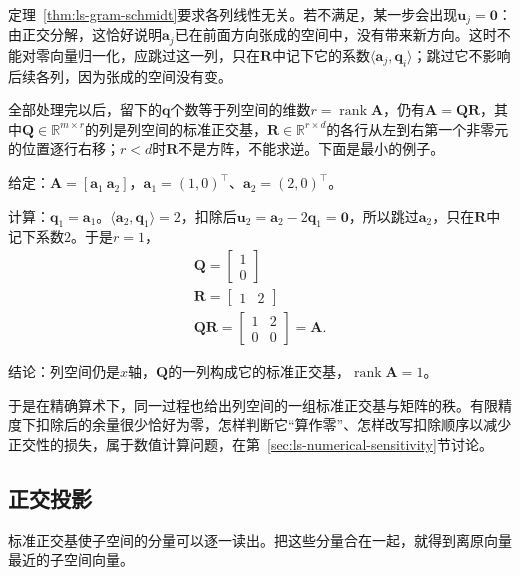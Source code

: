 定理~\ref{thm:ls-gram-schmidt}要求各列线性无关。若不满足，某一步会出现$\bm u_j=\bm0$：由正交分解，这恰好说明$\bm a_j$已在前面方向张成的空间中，没有带来新方向。这时不能对零向量归一化，应跳过这一列，只在$\bm R$中记下它的系数$\langle\bm a_j,\bm q_i\rangle$；跳过它不影响后续各列，因为张成的空间没有变。

全部处理完以后，留下的$\bm q$个数等于列空间的维数$r=\operatorname{rank}\bm A$，仍有$\bm A=\bm Q\bm R$，其中$\bm Q\in\mathbb R^{m\times r}$的列是列空间的标准正交基，$\bm R\in\mathbb R^{r\times d}$的各行从左到右第一个非零元的位置逐行右移；$r<d$时$\bm R$不是方阵，不能求逆。下面是最小的例子。
\begin{example}[列相关时跳过零余量]
\label{ex:ls-qr-dependent-columns}
给定：$\bm A=[\bm a_1\ \bm a_2]$，$\bm a_1=(1,0)^\top$、$\bm a_2=(2,0)^\top$。

计算：$\bm q_1=\bm a_1$。$\langle\bm a_2,\bm q_1\rangle=2$，扣除后$\bm u_2=\bm a_2-2\bm q_1=\bm0$，所以跳过$\bm a_2$，只在$\bm R$中记下系数$2$。于是$r=1$，
\[
\begin{gathered}
\bm Q=\begin{bmatrix}1\\0\end{bmatrix}\\
\bm R=\begin{bmatrix}1&2\end{bmatrix}\\
\bm Q\bm R=\begin{bmatrix}1&2\\0&0\end{bmatrix}=\bm A .
\end{gathered}
\]

结论：列空间仍是$x$轴，$\bm Q$的一列构成它的标准正交基，$\operatorname{rank}\bm A=1$。
\end{example}
于是在精确算术下，同一过程也给出列空间的一组标准正交基与矩阵的秩。有限精度下扣除后的余量很少恰好为零，怎样判断它“算作零”、怎样改写扣除顺序以减少正交性的损失，属于数值计算问题，在第~\ref{sec:ls-numerical-sensitivity}节讨论。

\subsection{正交投影}

标准正交基使子空间的分量可以逐一读出。把这些分量合在一起，就得到离原向量最近的子空间向量。

